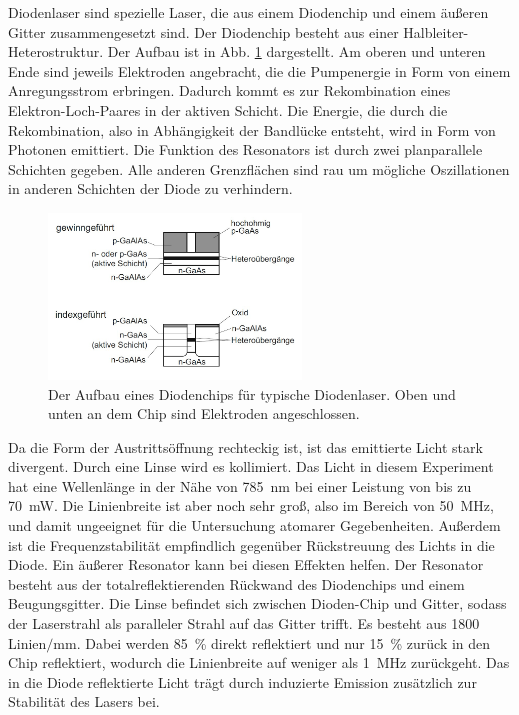 Diodenlaser sind spezielle Laser, die aus einem Diodenchip und einem äußeren Gitter zusammengesetzt sind. 
Der Diodenchip besteht aus einer Halbleiter-Heterostruktur. Der Aufbau ist in Abb. \ref{abb:chip} dargestellt. Am oberen und unteren Ende sind jeweils Elektroden angebracht, die die Pumpenergie in Form von einem Anregungsstrom erbringen. Dadurch kommt es zur Rekombination eines Elektron-Loch-Paares in der aktiven Schicht. Die Energie, die durch die Rekombination, also in Abhängigkeit der Bandlücke entsteht, wird in Form von Photonen emittiert. Die Funktion des Resonators ist durch zwei planparallele Schichten gegeben. Alle anderen Grenzflächen sind rau um mögliche Oszillationen in anderen Schichten der Diode zu verhindern.  

\begin{figure}
    \centering
    \includegraphics[width=0.6\textwidth]{pics/chip.jpg}
    \caption{Der Aufbau eines Diodenchips für typische Diodenlaser. Oben und unten an dem Chip sind Elektroden angeschlossen. \cite{eichler}}
    \label{abb:chip}
\end{figure}


Da die Form der Austrittsöffnung rechteckig ist, ist das emittierte Licht stark divergent. Durch eine Linse wird es kollimiert. Das Licht in diesem Experiment hat eine Wellenlänge in der Nähe von \SI{785}{\nm} bei einer Leistung von bis zu \SI{70}{\mW}. Die Linienbreite ist aber noch sehr groß, also im Bereich von \SI{50}{\MHz}, und damit ungeeignet für die Untersuchung atomarer Gegebenheiten. Außerdem ist die Frequenzstabilität empfindlich gegenüber Rückstreuung des Lichts in die Diode. Ein äußerer Resonator kann bei diesen Effekten helfen.
Der Resonator besteht aus der totalreflektierenden Rückwand des Diodenchips und einem Beugungsgitter.
Die Linse befindet sich zwischen Dioden-Chip und Gitter, sodass der Laserstrahl als paralleler Strahl auf das Gitter trifft.
Es besteht aus \num{1800} Linien$/$\si{\milli\metre}. Dabei werden \SI{85}{\percent} direkt reflektiert und nur \SI{15}{\percent} zurück in den Chip reflektiert, wodurch die Linienbreite auf weniger als \SI{1}{\MHz} zurückgeht. Das in die Diode reflektierte Licht trägt durch induzierte Emission zusätzlich zur Stabilität des Lasers bei. \cite{anleitung}

